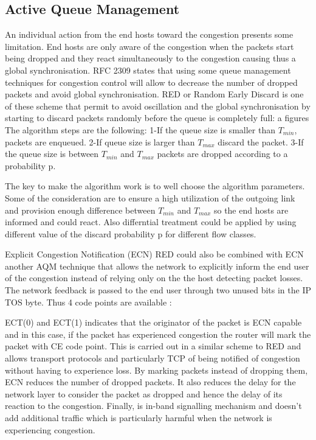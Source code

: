 \subsection{Active Queue Management}

An individual action from the end hosts toward the congestion presents some limitation. End hosts are only aware of the congestion when the packets start being dropped and they react simultaneously to the congestion causing thus a global synchronisation. RFC 2309 states that using some queue management techniques for congestion control will allow to decrease the number of dropped packets and avoid global synchronisation. 
RED or Random Early Discard is one of these scheme that permit to avoid oscillation and the global synchronisation by starting to discard packets randomly before the queue is completely full:
a figures
The algorithm steps are the following:
1-If the queue size is smaller than $T_{min}$, packets are enqueued.
2-If queue size is larger than $T_{max}$ discard the packet.
3-If the queue size is between $T_{min}$ and $T_{max}$ packets are dropped according to a probability p.

The key to make the algorithm work is to well choose the algorithm parameters. Some of the consideration are to ensure a high utilization of the outgoing link and provision enough difference between $T_{min}$ and $T_{max}$ so the end hosts are informed and could react. Also differntial treatment could be applied by using different value of the discard probability p for different flow classes. 

Explicit Congestion Notification (ECN)
RED could also be combined with ECN \cite {RFC 2481} another AQM technique that allows the network to explicitly inform the end user of the congestion instead of relying only on the the host detecting packet losses. The network feedback is passed to the end user through two unused bits in the IP TOS byte.  Thus 4 code points are available :

ECT(0) and ECT(1) indicates that the originator of the packet is ECN capable and in this case, if the packet has experienced congestion the router will mark the packet with CE code point. This is carried out in a similar scheme to RED and allows transport protocols and particularly TCP of being notified of congestion without having to experience loss. 
By marking packets instead of dropping them, ECN reduces the number of dropped packets. It also reduces the delay for the network layer to consider the packet as dropped and hence the delay of its reaction to the congestion. Finally, is in-band signalling mechanism and doesn't add additional traffic which is particularly harmful when the network is experiencing congestion.




